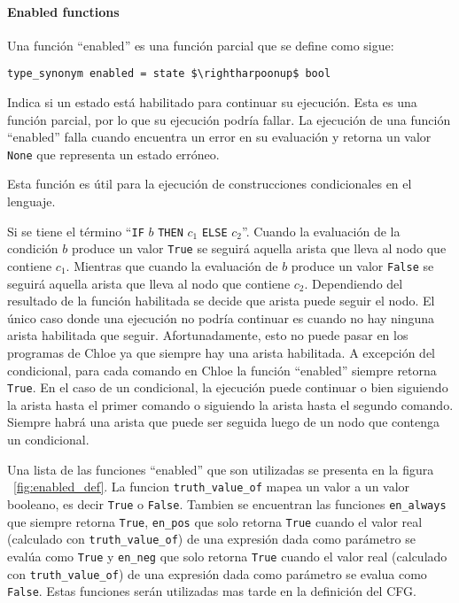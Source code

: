 \paragraph*{Enabled functions}\label{paragraph:enabled}

Una función ``enabled'' es una función parcial que se define como sigue:

\begin{lstlisting}[mathescape=true, frame=single]
type_synonym enabled = state $\rightharpoonup$ bool
\end{lstlisting}

Indica si un estado está habilitado para continuar su ejecución.
Esta es una función parcial, por lo que su ejecución podría fallar.
La ejecución de una función ``enabled'' falla cuando encuentra un error en su evaluación y retorna un valor \verb|None| que representa un estado erróneo.

Esta función es útil para la ejecución de construcciones condicionales en el lenguaje.

Si se tiene el término ``\verb|IF| $b$ \verb|THEN| $c_{1}$ \verb|ELSE| $c_{2}$''.
Cuando la evaluación de la condición $b$ produce un valor \verb|True| se seguirá aquella arista que lleva al nodo que contiene $c_1$.
Mientras que cuando la evaluación de $b$ produce un valor \verb|False| se seguirá aquella arista que lleva al nodo que contiene $c_2$.
Dependiendo del resultado de la función habilitada se decide que arista puede seguir el nodo.
El único caso donde una ejecución no podría continuar es cuando no hay ninguna arista habilitada que seguir.
Afortunadamente, esto no puede pasar en los programas de Chloe ya que siempre hay una arista habilitada.
A excepción del condicional, para cada comando en Chloe la función ``enabled'' siempre retorna \verb|True|.
En el caso de un condicional, la ejecución puede continuar o bien siguiendo la arista hasta el primer comando o siguiendo la arista hasta el segundo comando.
Siempre habrá una arista que puede ser seguida luego de un nodo que contenga un condicional.

Una lista de las funciones ``enabled'' que son utilizadas se presenta en la figura ~\ref{fig:enabled_def}.
La funcion \verb|truth_value_of| mapea un valor a un valor booleano, es decir \verb|True| o \verb|False|.
Tambien se encuentran las funciones \verb|en_always| que siempre retorna \verb|True|, \verb|en_pos| que solo retorna \verb|True| cuando el valor real (calculado con \verb|truth_value_of|) de una expresión dada como parámetro se evalúa como \verb|True| y \verb|en_neg| que solo retorna \verb|True| cuando el valor real (calculado con \verb|truth_value_of|) de una expresión dada como parámetro se evalua como \verb|False|.
Estas funciones serán utilizadas mas tarde en la definición del CFG.

